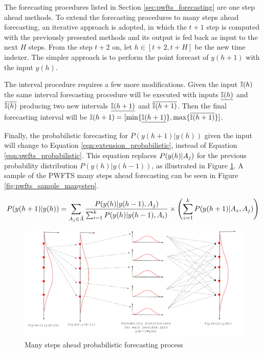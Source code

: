 The forecasting procedures listed in Section \ref{sec:pwfts_forecasting} are one step ahead methods. To extend the forecasting procedures to many steps ahead forecasting, an iterative approach is adopted, in which the $t+1$ step is computed with the previously presented methods and its output is fed back as input to the next $H$ steps. From the step $t+2$ on, let $h \in [t+2, t+H]$ be the new time indexer. The simpler approach is to perform the point forecast of $y(h+1)$  with the input $y(h)$.

The interval procedure requires a few more modifications. Given the input $\mathbb{I}(h)$ the same interval forecasting procedure will be executed with inputs $\underline{\mathbb{I}(h)}$ and $\overline{\mathbb{I}(h)}$ producing two new intervals $\underline{\mathbb{I}(h+1)}$ and $\overline{\mathbb{I}(h+1)}$. Then the final forecasting interval will be $\mathbb{I}(h+1) = [\min\{\underline{\mathbb{I}(h+1)}\}, \max\{\overline{\mathbb{I}(h+1)}\}]$. 

Finally, the probabilistic forecasting for $P(y(h+1)|y(h))$ given the input will change to  Equation \eqref{eqn:extension_probabilistic}, instead of Equation \eqref{eqn:pwfts_probabilistic}. This equation replaces $P(y(h) | A_j)$ for the previous probability distribution $P(y(h)|y(h-1))$, as illustrated in Figure \ref{fig:pwfts_probabilistic_manysteps}. A sample of the PWFTS many steps ahead forecasting can be seen in Figure \ref{fig:pwfts_sample_manystep}.


\begin{equation}
P(y(h+1) | y(h))  = \displaystyle \sum_{A_j \in \tilde{A}} \frac{ P(y(h)| y(h-1), A_j)}{ \sum_{i = 1}^k P(y(h)| y(h-1), A_i)} \times  \left(  \sum_{z = 1}^k  P(y(h+1) | A_z,A_j) \right)
\label{eqn:extension_probabilistic}
\end{equation}

\begin{figure}[htb]
    \centering
    \includegraphics[width=\textwidth]{figures/pwfts_probabilistic_manysteps.pdf}
    \caption{Many steps ahead probabilistic forecasting process}
    \label{fig:pwfts_probabilistic_manysteps}
\end{figure}
 
